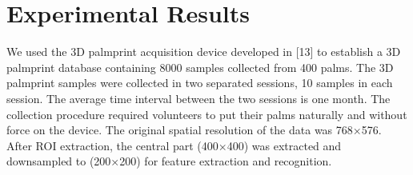 
\chapter{Experimental Results\label{ch:experiment}}

We used the 3D palmprint acquisition device developed in [13] to establish a 3D palmprint database containing 8000 samples collected from 400 palms. The 3D palmprint samples were collected in two separated sessions, 10 samples in each session. The average time interval between the two sessions is one month. The collection procedure required volunteers to put their palms naturally and without force on the device. The original spatial resolution of the data was 768×576. After ROI extraction, the central part (400×400) was extracted and downsampled to (200×200) for feature extraction and recognition.




